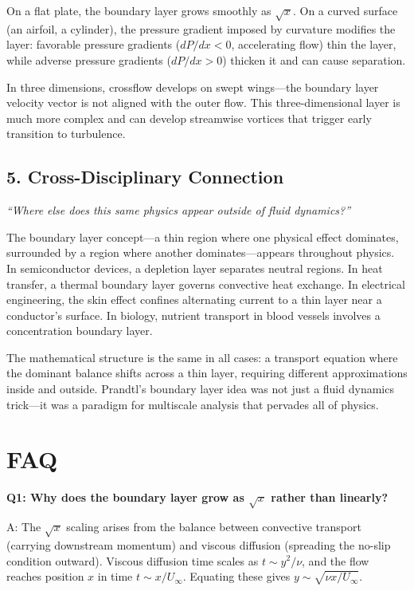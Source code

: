\documentclass[11pt,openright]{book}
\begin{document}
On a flat plate, the boundary layer grows smoothly as $\sqrt{x}$. On a curved surface (an airfoil, a cylinder), the pressure gradient imposed by curvature modifies the layer: favorable pressure gradients ($dP/dx < 0$, accelerating flow) thin the layer, while adverse pressure gradients ($dP/dx > 0$) thicken it and can cause separation.

In three dimensions, crossflow develops on swept wings---the boundary layer velocity vector is not aligned with the outer flow. This three-dimensional layer is much more complex and can develop streamwise vortices that trigger early transition to turbulence.

\subsection*{5. Cross-Disciplinary Connection}
\textit{``Where else does this same physics appear outside of fluid dynamics?''}

The boundary layer concept---a thin region where one physical effect dominates, surrounded by a region where another dominates---appears throughout physics. In semiconductor devices, a depletion layer separates neutral regions. In heat transfer, a thermal boundary layer governs convective heat exchange. In electrical engineering, the skin effect confines alternating current to a thin layer near a conductor's surface. In biology, nutrient transport in blood vessels involves a concentration boundary layer.

The mathematical structure is the same in all cases: a transport equation where the dominant balance shifts across a thin layer, requiring different approximations inside and outside. Prandtl's boundary layer idea was not just a fluid dynamics trick---it was a paradigm for multiscale analysis that pervades all of physics.


\section*{FAQ}

\textbf{Q1: Why does the boundary layer grow as $\sqrt{x}$ rather than linearly?}

A: The $\sqrt{x}$ scaling arises from the balance between convective transport (carrying downstream momentum) and viscous diffusion (spreading the no-slip condition outward). Viscous diffusion time scales as $t \sim y^2/\nu$, and the flow reaches position $x$ in time $t \sim x/U_\infty$. Equating these gives $y \sim \sqrt{\nu x / U_\infty}$.
\end{document}
